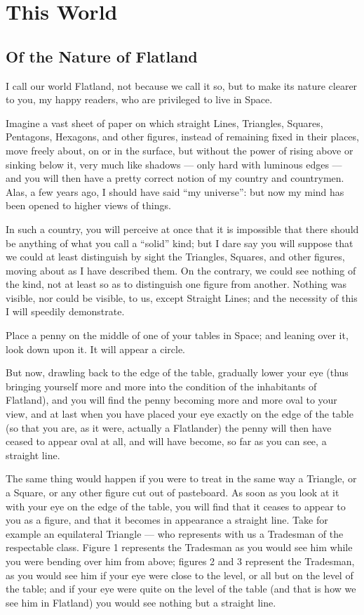\documentclass[10pt, kindle, oneside]{kindle}
\begin{document}
\mainmatter
\part{This World}
\chapter{Of the Nature of Flatland} 


I call our world Flatland, not because we
call it so, but to make its nature clearer to you, my happy readers, who are
privileged to live in Space.

Imagine a vast sheet of paper on which straight Lines, Triangles, Squares,
Pentagons, Hexagons, and other figures, instead of remaining fixed in their
places, move freely about, on or in the surface, but without the power of
rising above or sinking below it, very much like shadows --- only hard with
luminous edges --- and you will then have a pretty correct notion of my country
and countrymen. Alas, a few years ago, I should have said ``my universe'': but
now my mind has been opened to higher views of things.

In such a country, you will perceive at once that it is impossible that there
should be anything of what you call a ``solid'' kind; but I dare say you will
suppose that we could at least distinguish by sight the Triangles, Squares,
and other figures, moving about as I have described them. On the contrary, we
could see nothing of the kind, not at least so as to distinguish one figure
from another. Nothing was visible, nor could be visible, to us, except
Straight Lines; and the necessity of this I will speedily demonstrate.

Place a penny on the middle of one of your tables in Space; and leaning over
it, look down upon it. It will appear a circle.

But now, drawling back to the edge of the table, gradually lower your eye
(thus bringing yourself more and more into the condition of the inhabitants of
Flatland), and you will find the penny becoming more and more oval to your
view, and at last when you have placed your eye exactly on the edge of the
table (so that you are, as it were, actually a Flatlander) the penny will then
have ceased to appear oval at all, and will have become, so far as you can
see, a straight line.

The same thing would happen if you were to treat in the same way a Triangle,
or a Square, or any other figure cut out of pasteboard. As soon as you look at
it with your eye on the edge of the table, you will find that it ceases to
appear to you as a figure, and that it becomes in appearance a straight line.
Take for example an equilateral Triangle --- who represents with us a Tradesman
of the respectable class. Figure 1 represents the Tradesman as you would see
him while you were bending over him from above; figures 2 and 3 represent the
Tradesman, as you would see him if your eye were close to the level, or all
but on the level of the table; and if your eye were quite on the level of the
table (and that is how we see him in Flatland) you would see nothing but a
straight line.
\end{document}
